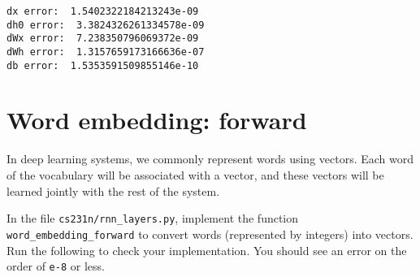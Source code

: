 \documentclass[11pt]{article}
\begin{document}
    \begin{Verbatim}[commandchars=\\\{\}]
dx error:  1.5402322184213243e-09
dh0 error:  3.3824326261334578e-09
dWx error:  7.238350796069372e-09
dWh error:  1.3157659173166636e-07
db error:  1.5353591509855146e-10

    \end{Verbatim}

    \hypertarget{word-embedding-forward}{%
\section{Word embedding: forward}\label{word-embedding-forward}}

In deep learning systems, we commonly represent words using vectors.
Each word of the vocabulary will be associated with a vector, and these
vectors will be learned jointly with the rest of the system.

In the file \texttt{cs231n/rnn\_layers.py}, implement the function
\texttt{word\_embedding\_forward} to convert words (represented by
integers) into vectors. Run the following to check your implementation.
You should see an error on the order of \texttt{e-8} or less.
\end{document}
